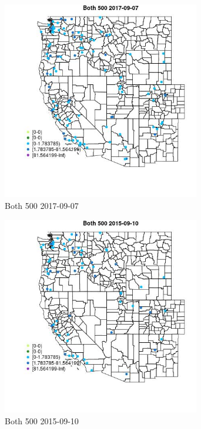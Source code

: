 \begin{figure} 
\centering  
\includegraphics[width=0.77\textwidth]{Code_Outputs/Report_ML_input_PM25_Step4_part_e_de_duplicated_aveswNAs_MapObsBoth_5002017-09-07.jpg} 
\caption{\label{fig:Report_ML_input_PM25_Step4_part_e_de_duplicated_aveswNAsMapObsBoth_5002017-09-07}Both 500 2017-09-07} 
\end{figure} 
 

\begin{figure} 
\centering  
\includegraphics[width=0.77\textwidth]{Code_Outputs/Report_ML_input_PM25_Step4_part_e_de_duplicated_aveswNAs_MapObsBoth_5002015-09-10.jpg} 
\caption{\label{fig:Report_ML_input_PM25_Step4_part_e_de_duplicated_aveswNAsMapObsBoth_5002015-09-10}Both 500 2015-09-10} 
\end{figure} 
 

